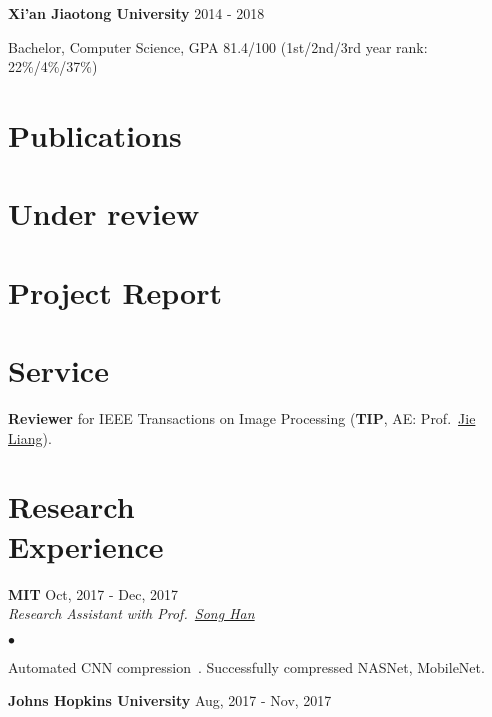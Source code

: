 \documentclass[margin,line]{res}
\newenvironment{list1}{
  \begin{list}{\ding{113}}{%
      \setlength{\itemsep}{0in}
      \setlength{\parsep}{0in} \setlength{\parskip}{0in}
      \setlength{\topsep}{0in} \setlength{\partopsep}{0in} 
      \setlength{\leftmargin}{0.17in}}}{\end{list}}
\newenvironment{list2}{
  \begin{list}{$\bullet$}{%
      \setlength{\itemsep}{0in}
      \setlength{\parsep}{0in} \setlength{\parskip}{0in}
      \setlength{\topsep}{0in} \setlength{\partopsep}{0in} 
      \setlength{\leftmargin}{0.2in}}}{\end{list}}
\begin{document}
\begin{resume}
{\bf Xi'an Jiaotong University} \hfill {2014 - 2018}\\
\vspace*{-.1in}
\begin{list1}
\item[] Bachelor, Computer Science, GPA 81.4/100 (1st/2nd/3rd year rank: 22\%/4\%/37\%)
\end{list1}



\section{\sc Publications}
\printbibliography[heading=none, type=inproceedings]

\section{\sc Under review}
\printbibliography[heading=none, type=article]

\section{\sc Project Report}
\printbibliography[heading=none, type=misc]


\section{\sc Service}
{\bf Reviewer} for IEEE Transactions on Image Processing (\textbf{TIP}, AE: Prof.~\href{http://www.sfu.ca/~jiel/}{Jie Liang}).


\section{\sc Research \\Experience}
{\bf MIT} \hfill {Oct, 2017 - Dec, 2017}\\%

\vspace{-.3in}
{\em Research Assistant with Prof.~\href{https://stanford.edu/~songhan/}{Song Han}}
\begin{list2}
\item Automated CNN compression~\cite{adc}. Successfully compressed NASNet, MobileNet.
\end{list2}

{\bf Johns Hopkins University} \hfill {Aug, 2017 - Nov, 2017}\\%


\end{resume}
\end{document}
